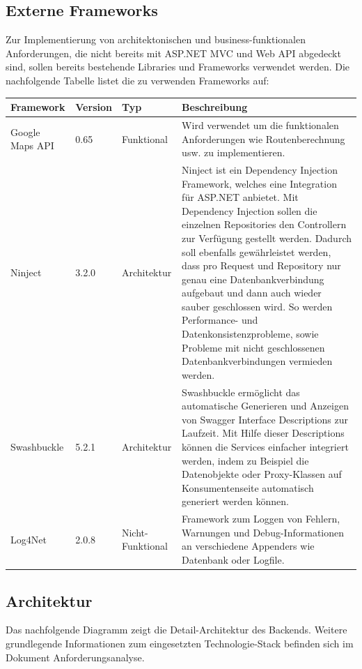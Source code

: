 \documentclass[a4paper,10pt,xetex]{article}
\begin{document}
\subsection[Externe Frameworks]{Externe Frameworks}

  Zur Implementierung von architektonischen und business-funktionalen Anforderungen, die nicht bereits mit ASP.NET MVC und
  Web API abgedeckt sind, sollen bereits bestehende Libraries und Frameworks verwendet werden. Die nachfolgende Tabelle
  listet die zu verwenden Frameworks auf:


\bigskip

\begin{longtabu} to \textwidth { | l | l | l | X[l] | }
  \hline
  \textbf{Framework} & \textbf{Version}  & \textbf{Typ} & \textbf{Beschreibung} \\
  \hline
  \endhead

    Google Maps API &
    0.65 &
    Funktional &
    Wird verwendet um die funktionalen Anforderungen wie Routenberechnung usw. zu
      implementieren.\\\hline
    Ninject &
    3.2.0 &
    Architektur &
    Ninject ist ein Dependency Injection Framework, welches eine Integration f\"ur ASP.NET
      anbietet. Mit Dependency Injection sollen die einzelnen Repositories den Controllern zur Verf\"ugung gestellt werden.
      Dadurch soll ebenfalls gew\"ahrleistet werden, dass pro Request und Repository nur genau eine Datenbankverbindung
      aufgebaut und dann auch wieder sauber geschlossen wird. So werden Performance- und Datenkonsistenzprobleme, sowie
      Probleme mit nicht geschlossenen Datenbankverbindungen vermieden werden.\\\hline
    Swashbuckle &
    5.2.1 &
    Architektur &
    Swashbuckle erm\"oglicht das automatische Generieren und Anzeigen von Swagger Interface
      Descriptions zur Laufzeit. Mit Hilfe dieser Descriptions k\"onnen die Services einfacher integriert werden, indem zu
      Beispiel die Datenobjekte oder Proxy-Klassen auf Konsumentenseite automatisch generiert werden k\"onnen.\\\hline
    Log4Net &
    2.0.8 &
    Nicht-Funktional &
    Framework zum Loggen von Fehlern, Warnungen und Debug-Informationen an verschiedene
      Appenders wie Datenbank oder Logfile.\\\hline
\end{longtabu}


\subsection[Architektur]{Architektur}
Das nachfolgende Diagramm zeigt die
    Detail-Architektur des Backends. Weitere grundlegende Informationen zum eingesetzten
    Technologie-Stack befinden sich im Dokument Anforderungsanalyse.
\end{document}
